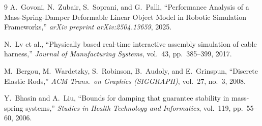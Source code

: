 \documentclass[11pt,a4paper]{article}
\begin{document}
\begin{thebibliography}{9}
    A.~Govoni, N.~Zubair, S.~Soprani, and G.~Palli,
    ``Performance Analysis of a Mass-Spring-Damper Deformable Linear Object
    Model in Robotic Simulation Frameworks,''
    \textit{arXiv preprint arXiv:2504.13659}, 2025.

    N.~Lv et al.,
    ``Physically based real-time interactive assembly simulation of cable
    harness,''
    \textit{Journal of Manufacturing Systems}, vol.~43, pp.~385--399, 2017.

    M.~Bergou, M.~Wardetzky, S.~Robinson, B.~Audoly, and E.~Grinspun,
    ``Discrete Elastic Rods,''
    \textit{ACM Trans.\ on Graphics (SIGGRAPH)}, vol.~27, no.~3, 2008.

    Y.~Bhasin and A.~Liu,
    ``Bounds for damping that guarantee stability in mass-spring systems,''
    \textit{Studies in Health Technology and Informatics}, vol.~119,
    pp.~55--60, 2006.
\end{thebibliography}
\end{document}
